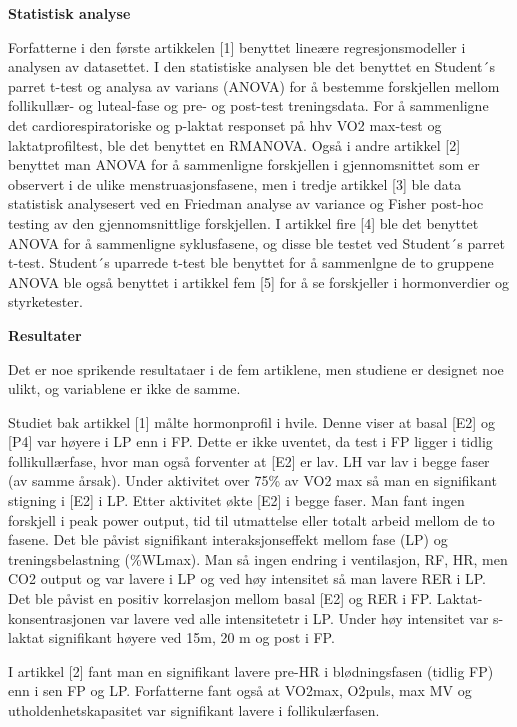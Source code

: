 \documentclass[
  letterpaper,
  DIV=11,
  numbers=noendperiod]{scrreprt}
\begin{document}
\textbf{Statistisk analyse}

Forfatterne i den første artikkelen {[}1{]} benyttet lineære
regresjonsmodeller i analysen av datasettet. I den statistiske analysen
ble det benyttet en Student´s parret t-test og analysa av varians
(ANOVA) for å bestemme forskjellen mellom follikullær- og luteal-fase og
pre- og post-test treningsdata. For å sammenligne det
cardiorespiratoriske og p-laktat responset på hhv VO2 max-test og
laktatprofiltest, ble det benyttet en RMANOVA. Også i andre artikkel
{[}2{]} benyttet man ANOVA for å sammenligne forskjellen i
gjennomsnittet som er observert i de ulike menstruasjonsfasene, men i
tredje artikkel {[}3{]} ble data statistisk analysesert ved en Friedman
analyse av variance og Fisher post-hoc testing av den gjennomsnittlige
forskjellen. I artikkel fire {[}4{]} ble det benyttet ANOVA for å
sammenligne syklusfasene, og disse ble testet ved Student´s parret
t-test. Student´s uparrede t-test ble benyttet for å sammenlgne de to
gruppene ANOVA ble også benyttet i artikkel fem {[}5{]} for å se
forskjeller i hormonverdier og styrketester.

\textbf{Resultater}

Det er noe sprikende resultataer i de fem artiklene, men studiene er
designet noe ulikt, og variablene er ikke de samme.

Studiet bak artikkel {[}1{]} målte hormonprofil i hvile. Denne viser at
basal {[}E2{]} og {[}P4{]} var høyere i LP enn i FP. Dette er ikke
uventet, da test i FP ligger i tidlig follikullærfase, hvor man også
forventer at {[}E2{]} er lav. LH var lav i begge faser (av samme årsak).
Under aktivitet over 75\% av VO2 max så man en signifikant stigning i
{[}E2{]} i LP. Etter aktivitet økte {[}E2{]} i begge faser. Man fant
ingen forskjell i peak power output, tid til utmattelse eller totalt
arbeid mellom de to fasene. Det ble påvist signifikant
interaksjonseffekt mellom fase (LP) og treningsbelastning (\%WLmax). Man
så ingen endring i ventilasjon, RF, HR, men CO2 output og var lavere i
LP og ved høy intensitet så man lavere RER i LP. Det ble påvist en
positiv korrelasjon mellom basal {[}E2{]} og RER i FP.
Laktat-konsentrasjonen var lavere ved alle intensitetetr i LP. Under høy
intensitet var s-laktat signifikant høyere ved 15m, 20 m og post i FP.

I artikkel {[}2{]} fant man en signifikant lavere pre-HR i
blødningsfasen (tidlig FP) enn i sen FP og LP. Forfatterne fant også at
VO2max, O2puls, max MV og utholdenhetskapasitet var signifikant lavere i
follikulærfasen.
\end{document}
